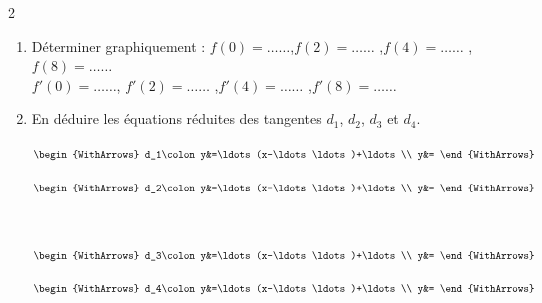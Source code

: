 \documentclass[main.tex]{subfiles}
\begin{document}
\begin{exercise}
\begin{minipage}{1\columnwidth}
	\end{minipage}
\begin{spacing}{2} 
	\begin{enumerate}[label=\arabic*),leftmargin=*]
		\item Déterminer graphiquement : 
		 $f\left(0 \right)=\ldots\ldots$,\hfill $f\left(2 \right)=\ldots\ldots$ ,\hfill $f\left(4 \right)=\ldots\ldots$ , \hfill $f\left(8 \right)=\ldots\ldots$  \\
		  $f'\left( 0 \right)=\ldots\ldots$, \hfill$f'\left( 2 \right)=\ldots\ldots$ ,\hfill $f'\left( 4 \right)=\ldots\ldots$ ,\hfill $f'\left( 8 \right)=\ldots\ldots$
		\item En déduire les équations réduites des tangentes $d_1$,  $d_2$,  $d_3$ et $d_4$.\\
\noindent
\parbox{0.45\linewidth}{ 
$\begin{WithArrows}
d_1\colon y&=\ldots (x-\ldots\ldots)+\ldots\\
y&= 
\end{WithArrows} $
}
\parbox{0.45\linewidth}{ 
$\begin{WithArrows}
d_2\colon 		y&=\ldots (x-\ldots\ldots)+\ldots\\
		y&= 
	\end{WithArrows} $
}
\\
\parbox{0.45\linewidth}{ 
$\begin{WithArrows}
d_3\colon 	y&=\ldots (x-\ldots\ldots)+\ldots\\
		y&= 
	\end{WithArrows} $
} 
\parbox{0.45\linewidth}{ 
$\begin{WithArrows}
	d_4\colon 	y&=\ldots (x-\ldots\ldots)+\ldots\\
	y&= 
\end{WithArrows} $
} 
\end{enumerate}	
\end{spacing}
\end{exercise}
\end{document}
